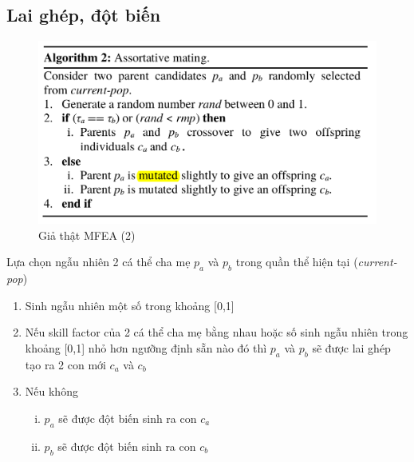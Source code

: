 \documentclass[a4paper,12pt]{report}
\begin{document}
\subsection{Lai ghép, đột biến}
\begin{figure}[H]
\centering 
\includegraphics[scale=0.6]{al2.png}
\caption{Giả thật MFEA (2)}
\end{figure}  
Lựa chọn ngẫu nhiên 2 cá thể cha mẹ $p_a$ và $p_b$ trong quần thể hiện tại (\emph{current-pop})
\begin{enumerate}
\item Sinh ngẫu nhiên một số trong khoảng [0,1] 
\item Nếu skill factor của 2 cá thể cha mẹ bằng nhau hoặc số sinh ngẫu nhiên trong khoảng [0,1] nhỏ hơn ngưỡng định sẵn nào đó thì $p_a$ và $p_b$ sẽ được lai ghép tạo ra 2 con mới $c_a$ và $c_b$
\item Nếu không 
\begin{enumerate}[i.]
\item $p_a$ sẽ được đột biến sinh ra con $c_a$
\item $p_b$ sẽ được đột biến sinh ra con $c_b$
\end{enumerate}
\end{enumerate}
\end{document}
